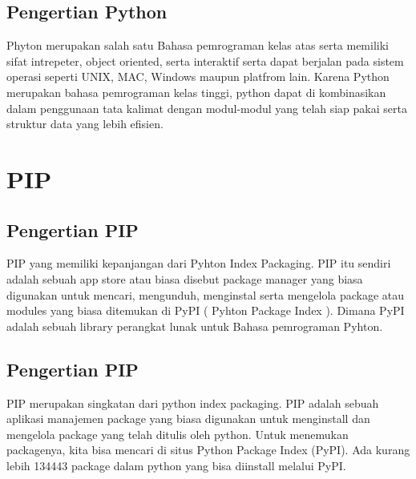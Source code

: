 \documentclass[12pt,a4paper]{article}
\begin{document}
\subsection{Pengertian Python}
Phyton merupakan salah satu Bahasa pemrograman kelas atas serta memiliki sifat intrepeter, object oriented, serta interaktif serta dapat berjalan pada sistem operasi seperti UNIX, MAC, Windows maupun platfrom lain. Karena Python merupakan bahasa pemrograman kelas tinggi, python dapat di kombinasikan dalam penggunaan tata kalimat dengan modul-modul yang telah siap pakai serta struktur data yang lebih efisien.

\section{PIP}
\subsection{Pengertian PIP}
PIP yang memiliki kepanjangan dari Pyhton Index Packaging. PIP itu sendiri adalah sebuah app store atau biasa disebut package manager yang biasa digunakan untuk mencari, mengunduh, menginstal serta mengelola package atau modules yang biasa ditemukan di PyPI ( Pyhton Package Index ). Dimana PyPI adalah sebuah library perangkat lunak untuk Bahasa pemrograman Pyhton.
\subsection{Pengertian PIP}
PIP merupakan singkatan dari python index packaging. PIP adalah sebuah aplikasi manajemen package yang biasa digunakan untuk menginstall dan mengelola package yang telah ditulis oleh python. Untuk menemukan packagenya, kita bisa mencari di situs Python Package Index (PyPI). Ada kurang lebih 134443 package dalam python yang bisa diinstall melalui PyPI.
\end{document}
